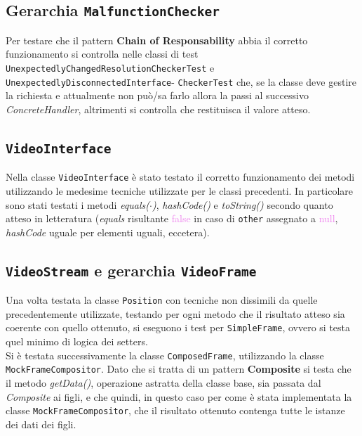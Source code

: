 \documentclass[a4paper,11pt]{article}
\begin{document}
	\subsection{Gerarchia \texttt{MalfunctionChecker}}
	Per testare che il pattern \textbf{Chain of Responsability} abbia il corretto funzionamento si controlla nelle classi di test \texttt{UnexpectedlyChangedResolutionCheckerTest} e {\texttt{UnexpectedlyDisconnectedInterface}- \texttt{CheckerTest}} che, se la classe deve gestire la richiesta e attualmente non può/sa farlo allora la passi al successivo \textit{ConcreteHandler}, altrimenti si controlla che restituisca il valore atteso.
	
	
	\subsection{\texttt{VideoInterface}}
	Nella classe \texttt{VideoInterface} è stato testato il corretto funzionamento dei metodi utilizzando le medesime tecniche utilizzate per le classi precedenti. In particolare sono stati testati i metodi \textit{equals($\cdot$)}, \textit{hashCode()} e \textit{toString()} secondo quanto atteso in letteratura (\textit{equals} risultante \textcolor{violet}{false} in caso di \texttt{other} assegnato a \textcolor{violet}{null}, \textit{hashCode} uguale per elementi uguali, eccetera).
	
	
	\subsection{\texttt{VideoStream} e gerarchia \texttt{VideoFrame}}
	Una volta testata la classe \texttt{Position} con tecniche non dissimili da quelle precedentemente utilizzate, testando per ogni metodo che il risultato atteso sia coerente con quello ottenuto, si eseguono i test per \texttt{SimpleFrame}, ovvero si testa quel minimo di logica dei setters.\\
	Si è testata successivamente la classe \texttt{ComposedFrame}, utilizzando la classe \texttt{MockFrameCompositor}. Dato che si tratta di un pattern \textbf{Composite} si testa che il metodo \textit{getData()}, operazione astratta della classe base, sia passata dal \textit{Composite} ai figli, e che quindi, in questo caso per come è stata implementata la classe \texttt{MockFrameCompositor}, che il risultato ottenuto contenga tutte le istanze dei dati dei figli.
	
	
\end{document}

